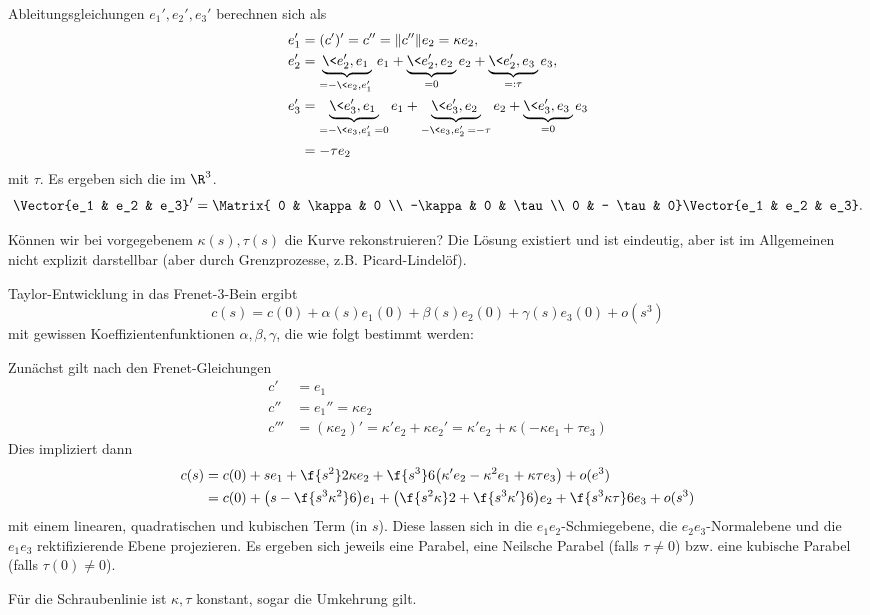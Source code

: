 Ableitungsgleichungen $e_1', e_2', e_3'$ berechnen sich als
\begin{align*}
	e_1' &= (c')' = c'' = \|c''\| e_2 = \kappa e_2, \\
	e_2' &= \underbrace{\<e_2', e_1\>}_{=-\<e_2, e_1'\>} e_1 + \underbrace{\<e_2', e_2\>}_{=0} e_2 + \underbrace{\<e_2', e_3\>}_{=: \tau} e_3, \\
	e_3' &= \underbrace{\<e_3', e_1\>}_{=-\<e_3, e_1'\> = 0} e_1 + \underbrace{\<e_3', e_2\>}_{-\<e_3, e_2'\> = -\tau} e_2 + \underbrace{\< e_3', e_3 \>}_{=0} e_3 \\
	&= - \tau e_2
\end{align*}
mit  $\tau$.
Es ergeben sich die  im $\R^3$.
\[
	\Vector{e_1 & e_2 & e_3}'
	= \Matrix{ 0 & \kappa & 0 \\ -\kappa & 0 & \tau \\ 0 & - \tau & 0}
	\Vector{e_1 & e_2 & e_3}.
\]

Können wir bei vorgegebenem $\kappa(s), \tau(s)$ die Kurve rekonstruieren?
Die Lösung existiert und ist eindeutig, aber ist im Allgemeinen nicht explizit darstellbar (aber durch Grenzprozesse, z.B. Picard-Lindelöf).

Taylor-Entwicklung in das Frenet-3-Bein ergibt
\[
	c(s) = c(0) + \alpha(s)e_1(0) + \beta(s) e_2(0) + \gamma(s) e_3(0) + o(s^3)
\]
mit gewissen Koeffizientenfunktionen $\alpha, \beta, \gamma$, die wie folgt bestimmt werden:

Zunächst gilt nach den Frenet-Gleichungen
\begin{align*}
	c' &= e_1 \\
	c'' &= e_1'' = \kappa e_2 \\
	c''' &= (\kappa e_2)' = \kappa' e_2 + \kappa e_2' = \kappa' e_2 + \kappa(-\kappa e_1 + \tau e_3)
\end{align*}
Dies impliziert dann
\begin{align*}
	c(s) &= c(0) + se_1 + \f {s^2}2 \kappa e_2 + \f {s^3}6 \big( \kappa' e_2 - \kappa^2 e_1 + \kappa \tau e_3 \big) + o(e^3) \\
	&= c(0) + \big( s - \f {s^3 \kappa^2}6 \big) e_1 + \big( \f {s^2 \kappa}2 + \f {s^3\kappa'}6 \big) e_2 + \f{s^3 \kappa \tau}6 e_3 + o(s^3)
\end{align*}
mit einem linearen, quadratischen und kubischen Term (in $s$).
Diese lassen sich in die $e_1e_2$-Schmiegebene, die $e_2e_3$-Normalebene und die $e_1e_3$ rektifizierende Ebene projezieren.
Es ergeben sich jeweils eine Parabel, eine Neilsche Parabel (falls $\tau \neq 0$) bzw. eine kubische Parabel (falls $\tau(0) \neq 0$).


Für die Schraubenlinie ist $\kappa, \tau$ konstant, sogar die Umkehrung gilt.








